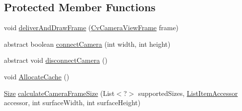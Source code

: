 \subsection*{Protected Member Functions}
\begin{DoxyCompactItemize}
\item 
void \mbox{\hyperlink{classorg_1_1opencv_1_1android_1_1_camera_bridge_view_base_a46d426c0a00ce5dd67bc693b112bcbd1}{deliver\+And\+Draw\+Frame}} (\mbox{\hyperlink{interfaceorg_1_1opencv_1_1android_1_1_camera_bridge_view_base_1_1_cv_camera_view_frame}{Cv\+Camera\+View\+Frame}} frame)
\item 
abstract boolean \mbox{\hyperlink{classorg_1_1opencv_1_1android_1_1_camera_bridge_view_base_a365f7a8b8dc4e6b7084cdd379fe37d6d}{connect\+Camera}} (int width, int height)
\item 
abstract void \mbox{\hyperlink{classorg_1_1opencv_1_1android_1_1_camera_bridge_view_base_a716a7c7d298dfcb50926ac6ebd1fbddf}{disconnect\+Camera}} ()
\item 
void \mbox{\hyperlink{classorg_1_1opencv_1_1android_1_1_camera_bridge_view_base_ac803ad92d23ea7b0971d694cae3653eb}{Allocate\+Cache}} ()
\item 
\mbox{\hyperlink{classorg_1_1opencv_1_1core_1_1_size}{Size}} \mbox{\hyperlink{classorg_1_1opencv_1_1android_1_1_camera_bridge_view_base_a91b8301cfdec04ca223d87aa5fd6e74c}{calculate\+Camera\+Frame\+Size}} (List$<$?$>$ supported\+Sizes, \mbox{\hyperlink{interfaceorg_1_1opencv_1_1android_1_1_camera_bridge_view_base_1_1_list_item_accessor}{List\+Item\+Accessor}} accessor, int surface\+Width, int surface\+Height)
\end{DoxyCompactItemize}
